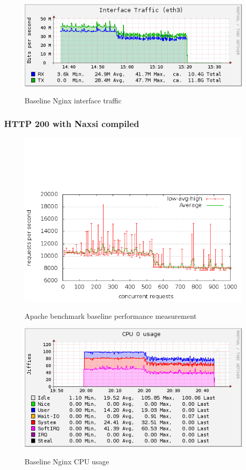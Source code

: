 \documentclass[Measurements]{subfiles}
\begin{document}
\begin{figure}[H]
\centering
\caption{Baseline Nginx interface traffic}
\includegraphics[scale=0.7]{images/results/200_without_naxsi/interface.png}
\label{fig:Baseline Nginx interface traffic}
\end{figure}

\subsubsection{HTTP 200 with Naxsi compiled}

\begin{figure}[H]
\caption{Apache benchmark baseline performance measurement}
\centering
\includegraphics[scale=0.55] {images/results/200_with_naxsi_compiled/output.png}
\label{fig:Baseline performance measurement}
\end{figure}

\begin{figure}[H]
\centering
\caption{Baseline Nginx CPU usage}
\includegraphics[scale=0.7]{images/results/200_with_naxsi_compiled/cpu.png}
\label{fig:Baseline Nginx CPU usage}
\end{figure}
\end{document}
